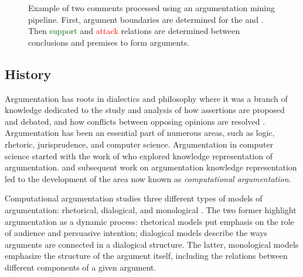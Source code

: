 \begin{figure}[t!]
\caption{Example of two comments processed using an argumentation mining pipeline. 
	First, argument boundaries are determined for the  and 
	. Then \textcolor{darkgreen}{support} and 
	\textcolor{red}{attack} relations are
	determined between conclusions and premises
	to form arguments.
	}
	\label{fig:example_pipeline}
\end{figure}

\subsection{History}

Argumentation has roots in dialectics and philosophy where it was a branch of
knowledge dedicated to the study and analysis of how assertions are proposed
and debated, and how conflicts between opposing opinions are resolved
\citep{bench2007argumentation}.  Argumentation has been an essential part of
numerous areas, such as logic, rhetoric, jurisprudence, and computer science. 
Argumentation in computer science started with 
the work of \citep{dung1995acceptability} who explored knowledge representation
of argumentation. \citet{dung1995acceptability} and subsequent work on argumentation
knowledge representation led to the development of 
the area now known as \emph{computational argumentation}. 

Computational argumentation studies three different types of models of argumentation:
rhetorical, dialogical, and monological \citep{bentahar2010taxonomy}. 
The two former highlight argumentation as a dynamic process: rhetorical models
put emphasis on the role of audience and persuasive intention; dialogical 
models describe the ways arguments are connected in a dialogical structure. 
The latter, monological models emphasize the structure of the argument itself, 
including the relations between different components of a given argument. 

